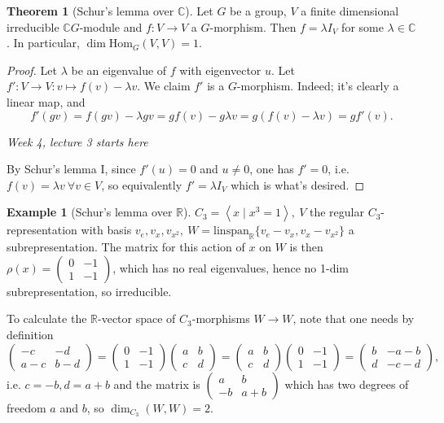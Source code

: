 \documentclass[a4paper]{article}
\newcommand{\la}{\left\langle}
\newcommand{\ra}{\right\rangle}
\newcommand{\R}{\mathbb{R}}
\newcommand{\C}{\mathbb{C}}
\newcommand{\Hom}{\text{Hom}}
\theoremstyle{definition}
\newtheorem{thm}[defn]{Theorem}
\newtheorem{example}[defn]{Example}
\begin{document}
\begin{thm}[Schur's lemma over $\C$]
\label{thm:SchurslemmaoverC}
Let $G$ be a group, $V$ a finite dimensional irreducible $\C G$-module and $f:V\rightarrow V$ a $G$-morphism. Then $f=\lambda I_V$ for some $\lambda\in\C$. In particular, $\dim\Hom_G(V,V)=1$.
\end{thm}
\begin{proof}
Let $\lambda$ be an eigenvalue of $f$ with eigenvector $u$. Let $f':V\rightarrow V:v\mapsto f(v)-\lambda v$. We claim $f'$ is a $G$-morphism. Indeed; it's clearly a linear map, and
\[
f'(gv)=f(gv)-\lambda gv=gf(v)-g\lambda v=g(f(v)-\lambda v)=gf'(v).
\]

\begin{flushright}
\textit{Week 4, lecture 3 starts here}
\end{flushright}

By Schur's lemma I, since $f'(u)=0$ and $u\neq 0$, one has $f'=0$, i.e. $f(v)=\lambda v \ \forall v\in V$, so equivalently $f'=\lambda I_V$ which is what's desired.
\end{proof}

\begin{example}[Schur's lemma over $\R$]
$C_3=\la x\mid x^3=1\ra,\ V$ the regular $C_3$-representation with basis $v_e,v_x,v_{x^2},\ W=\text{linspan}_\R\{v_e-v_x,v_x-v_{x^2}\}$ a subrepresentation. The matrix for this action of $x$ on $W$ is then $\rho(x)=\begin{pmatrix}0&-1\\1&-1\end{pmatrix}$, which has no real eigenvalues, hence no 1-dim subrepresentation, so irreducible.

To calculate the $\R$-vector space of $C_3$-morphisms $W\rightarrow W$, note that one needs by definition
\[
\begin{pmatrix}-c&-d\\a-c&b-d\end{pmatrix}=\begin{pmatrix}0&-1\\1&-1\end{pmatrix}\begin{pmatrix}a&b\\c&d\end{pmatrix}=\begin{pmatrix}a&b\\c&d\end{pmatrix}\begin{pmatrix}0&-1\\1&-1\end{pmatrix}=\begin{pmatrix}b&-a-b\\d&-c-d\end{pmatrix},
\]
i.e. $c=-b,d=a+b$ and the matrix is $\begin{pmatrix}a&b\\-b&a+b\end{pmatrix}$ which has two degrees of freedom $a$ and $b$, so $\dim_{C_3}(W,W)=2$.
\end{example}
\end{document}
